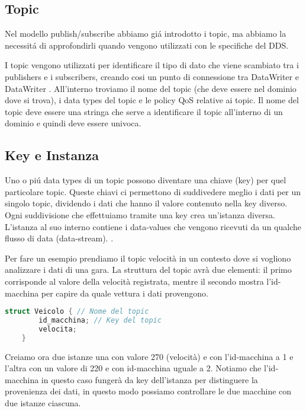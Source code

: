 \subsection{Topic}
Nel modello publish/subscribe abbiamo giá introdotto i topic, ma 
abbiamo la necessitá di approfondirli quando vengono utilizzati
con le specifiche del DDS.

I topic vengono utilizzati per identificare il tipo di dato che viene
scambiato tra i publishers e i subscribers, creando cosi un punto
di connessione 
tra DataWriter e DataWriter\cite{topicomg} .
All'interno troviamo il nome del topic
(che deve essere nel dominio dove si trova),
i data types del topic e le policy QoS relative ai topic.
Il nome del topic deve essere una stringa che serve 
a identificare il topic all'interno di un dominio e quindi deve essere
univoca.




\subsection{Key e Instanza}
Uno o piú data types di un topic possono diventare una chiave (key) per 
quel particolare topic. Queste chiavi ci permettono di suddivedere meglio
i dati per un singolo topic, dividendo i dati che hanno il valore contenuto
nella key diverso. Ogni suddivisione che effettuiamo tramite una key crea 
un'istanza diversa. L'istanza al suo interno contiene i data-values che 
vengono ricevuti da un qualche flusso di data (data-stream).
 \cite{Instance81:online}.

Per fare un esempio prendiamo il topic velocità in un contesto dove si
vogliono analizzare i dati di una gara.
La struttura del topic avrà due elementi: il primo corrisponde al valore
della velocità registrata, mentre il secondo mostra l'id-macchina per 
capire da quale vettura i dati provengono.

\vspace{5mm} %
\begin{lstlisting}[language=C++, caption=Esempio di Topic con una key
    usando il linguaggio IDL
    , label=Topic struct,
    captionpos=b]
    struct Veicolo { // Nome del topic
        id_macchina; // Key del topic
        velocita;
    }
    \end{lstlisting}
\vspace{5mm}

Creiamo ora due istanze una con valore 270 (velocità) e con 
l'id-macchina a 1 e l'altra con un valore di 220 e con id-macchina 
uguale a 2. Notiamo che l'id-macchina in questo caso fungerà da key 
dell'istanza per distinguere la provenienza dei dati, in questo
modo possiamo controllare le due macchine con due istanze ciascuna.


